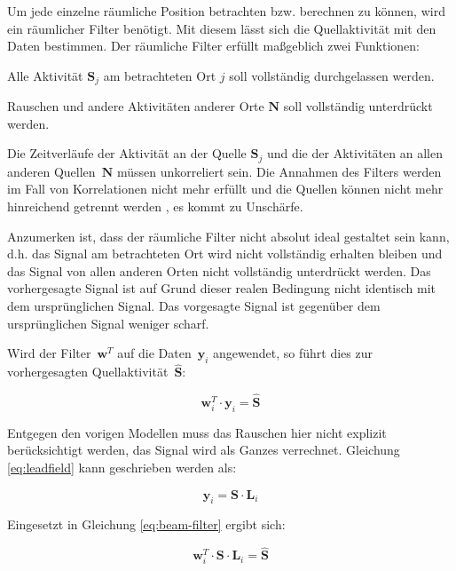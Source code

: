 \documentclass[doc,a4paper,12pt]{apa6}
\newcommand{\mx}[1]{\mathbf{#1}}
\begin{document}
Um jede einzelne räumliche Position betrachten bzw. berechnen zu können, wird ein räumlicher Filter benötigt. Mit diesem lässt sich die Quellaktivität mit den Daten bestimmen. Der räumliche Filter erfüllt maßgeblich zwei Funktionen:

\begin{compactitem}
\item Alle Aktivität $\mx{S}_j$ am betrachteten Ort $j$ soll vollständig durchgelassen werden.
\item Rauschen und andere Aktivitäten anderer Orte $\mx{N}$ soll vollständig unterdrückt werden.
\end{compactitem}

Die Zeitverläufe der Aktivität an der Quelle $\mx{S}_j$ und die der Aktivitäten an allen anderen Quellen~$\mx{N}$ müssen unkorreliert sein. Die Annahmen des Filters werden im Fall von Korrelationen nicht mehr erfüllt und die Quellen können nicht mehr hinreichend getrennt werden \parencite{van1997localization}, es kommt zu Unschärfe.

Anzumerken ist, dass der räumliche Filter nicht absolut ideal gestaltet sein kann, d.h. das Signal am betrachteten Ort wird nicht vollständig erhalten bleiben und das Signal von allen anderen Orten nicht vollständig unterdrückt werden. Das vorhergesagte Signal ist auf Grund dieser realen Bedingung nicht identisch mit dem ursprünglichen Signal. Das vorgesagte Signal ist gegenüber dem ursprünglichen Signal weniger scharf.

Wird der Filter~$\mx{w}^T$ auf die Daten~$\mx{y}_i$ angewendet, so führt dies zur vorhergesagten Quellaktivität~$\mx{\hat S}$:

\begin{equation}
\label{eq:beam-filter}
\mx{w}_i^T \cdot \mx{y}_i = \mx{\hat S}
\end{equation}

Entgegen den vorigen Modellen muss das Rauschen hier nicht explizit berücksichtigt werden, das Signal wird als Ganzes verrechnet. Gleichung \ref{eq:leadfield} kann geschrieben werden als:

\begin{equation}
\mx{y}_i = \mx{S} \cdot \mx{L}_i
\end{equation}

Eingesetzt in Gleichung \ref{eq:beam-filter} ergibt sich:

\begin{equation}
\mx{w}_i^T \cdot \mx{S} \cdot \mx{L}_i = \mx{\hat S}
\end{equation}
\end{document}

